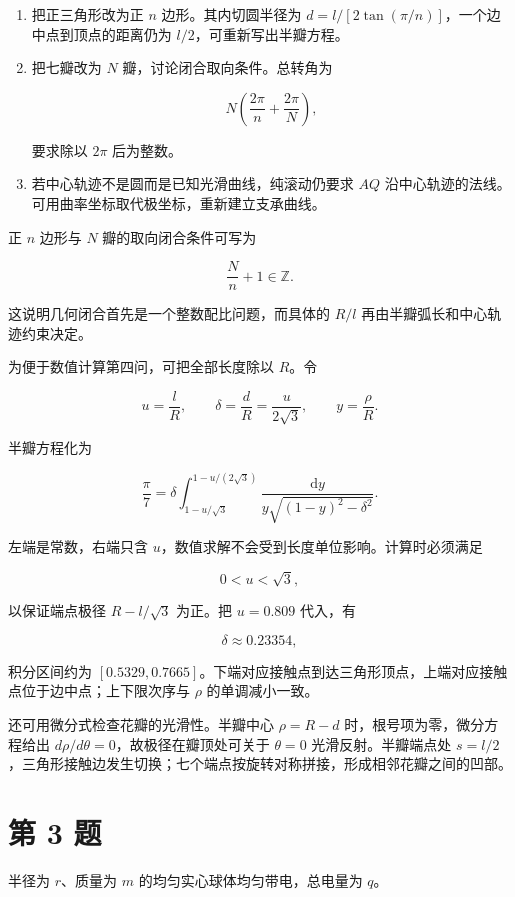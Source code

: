 \documentclass[12pt,a4paper,UTF8]{ctexart}
\begin{document}
\begin{enumerate}
\def\labelenumi{\arabic{enumi}.}
\item
  把正三角形改为正 \(n\) 边形。其内切圆半径为
  \(d=l/[2\tan(\pi/n)]\)，一个边中点到顶点的距离仍为
  \(l/2\)，可重新写出半瓣方程。
\item
  把七瓣改为 \(N\) 瓣，讨论闭合取向条件。总转角为

  \[N\left(\frac{2\pi}{n}+\frac{2\pi}{N}\right),\]

  要求除以 \(2\pi\) 后为整数。
\item
  若中心轨迹不是圆而是已知光滑曲线，纯滚动仍要求 \(AQ\)
  沿中心轨迹的法线。可用曲率坐标取代极坐标，重新建立支承曲线。
\end{enumerate}

正 \(n\) 边形与 \(N\) 瓣的取向闭合条件可写为

\[\frac{N}{n}+1\in\mathbb Z.\]

这说明几何闭合首先是一个整数配比问题，而具体的 \(R/l\)
再由半瓣弧长和中心轨迹约束决定。

为便于数值计算第四问，可把全部长度除以 \(R\)。令

\[u=\frac lR,\qquad \delta=\frac dR=\frac{u}{2\sqrt3},\qquad y=\frac\rho R.\]

半瓣方程化为

\[\frac{\pi}{7}
=\delta\int_{1-u/\sqrt3}^{1-u/(2\sqrt3)}
\frac{\mathrm{d}y}{y\sqrt{(1-y)^2-\delta^2}}.\]

左端是常数，右端只含 \(u\)，数值求解不会受到长度单位影响。计算时必须满足

\[0<u<\sqrt3,\]

以保证端点极径 \(R-l/\sqrt3\) 为正。把 \(u=0.809\) 代入，有

\[\delta\approx0.23354,\]

积分区间约为
\([0.5329,0.7665]\)。下端对应接触点到达三角形顶点，上端对应接触点位于边中点；上下限次序与
\(\rho\) 的单调减小一致。

还可用微分式检查花瓣的光滑性。半瓣中心 \(\rho=R-d\)
时，根号项为零，微分方程给出 \(d\rho/d\theta=0\)，故极径在瓣顶处可关于
\(\theta=0\) 光滑反射。半瓣端点处
\(s=l/2\)，三角形接触边发生切换；七个端点按旋转对称拼接，形成相邻花瓣之间的凹部。

\newpage

\section{第 3 题}\label{ux7b2c-3-ux9898}

半径为 \(r\)、质量为 \(m\) 的均匀实心球体均匀带电，总电量为 \(q\)。
\end{document}
